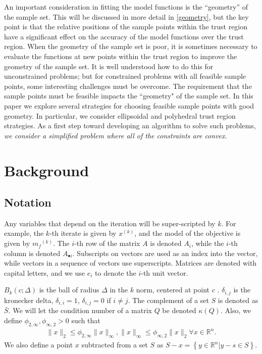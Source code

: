 \documentclass{article}
\theoremstyle{case}
\newcommand{\xk}{{x^{(k)}}}
\newcommand{\Rn}{\mathbb R^n}
\newcommand{\mfk}{{{m}_f}^{(k)}}
\begin{document}
An important consideration in fitting the model functions is the ``geometry'' of the sample set.
This will be discussed in more detail in \cref{geometry}, but the key point is that the relative positions of the sample points within the trust region have a significant effect on the accuracy of the model functions over the trust region.
When the geometry of the sample set is poor, it is sometimes necessary to evaluate the functions at new points within the trust region to improve the geometry of the sample set.
It is well understood how to do this for unconstrained problems; but for constrained problems with all feasible sample points, some interesting challenges must be overcome.
The requirement that the sample points must be feasible impacts the ``geometry" of the sample set.
In this paper we explore several strategies for choosing feasible sample points with good geometry.
In particular, we consider ellipsoidal and polyhedral trust region strategies.
As a first step toward developing an algorithm to solve such problems, \emph{we consider a simplified problem where all of the constraints are convex}.


\section{Background}

\subsection{Notation}

Any variables that depend on the iteration will be super-scripted by $k$.
For example, the $k$-th iterate is given by $\xk$, and the model of the objective is given by $\mfk$.
The $i$-th row of the matrix $A$ is denoted $A_i$, while the $i$-th column is denoted $A_{\bullet i}$.
Subscripts on vectors are used as an index into the vector, while vectors in a sequence of vectors use superscripts.
Matrices are denoted with capital letters, and we use $e_i$ to denote the $i$-th unit vector.                     %

$B_k(c; \Delta)$ is the ball of radius $\Delta$ in the $k$ norm, centered at point $c$ .
$\delta_{i,j}$ is the kronecker delta, $\delta_{i,i} = 1$, $\delta_{i,j} = 0$ if $i\ne j$.
The complement of a set $S$ is denoted as $\bar S$.
We will let the condition number of a matrix $Q$ be denoted $\kappa(Q)$.
Also, we define $\phi_{2,\infty},\phi_{\infty,2}>0$ such that 
\begin{align}
\|x\|_2 \le \phi_{2, \infty}\|x\|_{\infty}, \|x\|_{\infty} \le \phi_{\infty,2}\|x\|_2\forall x \in \Rn \label{define_norm_changers}.
\end{align}
We also define a point $x$ subtracted from a set $S$ as $S - x = \left\{y \in \Rn | y - s \in S\right\}$.
\end{document}
